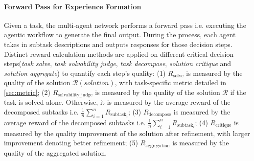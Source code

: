 \documentclass[preprint]{article}
\begin{document}
\paragraph{Forward Pass for Experience Formation}
\label{sec:forwardpass}
Given a task, the multi-agent network performs a forward pass i.e. executing the agentic workflow to generate the final output.
During the process, each agent takes in subtask descriptions and outputs responses for those decision steps.
Distinct reward calculation methods are applied on different critical decision steps(\emph{task solve}, \emph{task solvability judge}, \emph{task decompose}, \emph{solution critique} and \emph{solution aggregate}) to quantify each step's quality:
(1) $R_\mathrm{solve}$ is measured by the quality of the solution $\mathcal{R}(solution)$, with task-specific metric detailed in \cref{sec:metric};
(2) $R_{\text{solvability\_judge}}$ is measured by the quality of the solution $\mathcal{R}$ if the task is solved alone. Otherwise, it is measured by the average reward of the decomposed subtasks i.e. $\frac{1}{n} \sum_{i=1}^n R_{\text{subtask}_i}$;
(3) $R_{\text{decompose}}$ is measured by the average reward of the decomposed subtasks i.e. $\frac{1}{n} \sum_{i=1}^n R_{\text{subtask}_i}$;
(4) $R_{\text{critique}}$ is measured by the quality improvement of the solution after refinement, with larger improvement denoting better refinement;
(5) $R_{\text{aggregation}}$ is measured by the quality of the aggregated solution.
\end{document}
